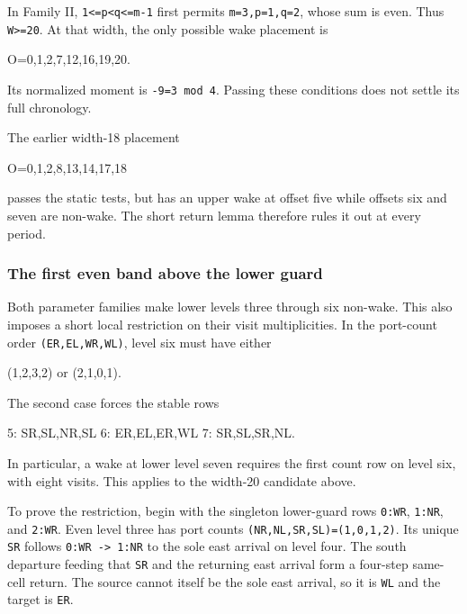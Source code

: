 \documentclass[11pt,letterpaper]{article}
\theoremstyle{plain}
\theoremstyle{definition}
\begin{document}
\begin{NoHyper}
In Family II, \texttt{1\textless{}=p\textless{}q\textless{}=m-1} first permits \texttt{m=3,p=1,q=2}, whose sum is even. Thus \texttt{W\textgreater{}=20}. At that width, the only possible wake placement is

\begin{codeblock}
O={0,1,2,7,12,16,19,20}.
\end{codeblock}

Its normalized moment is \texttt{-9=3\ mod\ 4}. Passing these conditions does not settle its full chronology.

The earlier width-18 placement

\begin{codeblock}
O={0,1,2,8,13,14,17,18}
\end{codeblock}

passes the static tests, but has an upper wake at offset five while offsets six and seven are non-wake. The short return lemma therefore rules it out at every period.

\subsubsection{The first even band above the lower guard}

Both parameter families make lower levels three through six non-wake. This also imposes a short local restriction on their visit multiplicities. In the port-count order \texttt{(ER,EL,WR,WL)}, level six must have either

\begin{codeblock}
(1,2,3,2) or (2,1,0,1).
\end{codeblock}

The second case forces the stable rows

\begin{codeblock}
5: SR,SL,NR,SL
6: ER,EL,ER,WL
7: SR,SL,SR,NL.
\end{codeblock}

In particular, a wake at lower level seven requires the first count row on level six, with eight visits. This applies to the width-20 candidate above.

To prove the restriction, begin with the singleton lower-guard rows \texttt{0:WR}, \texttt{1:NR}, and \texttt{2:WR}. Even level three has port counts \texttt{(NR,NL,SR,SL)=(1,0,1,2)}. Its unique \texttt{SR} follows \texttt{0:WR\ -\textgreater{}\ 1:NR} to the sole east arrival on level four. The south departure feeding that \texttt{SR} and the returning east arrival form a four-step same-cell return. The source cannot itself be the sole east arrival, so it is \texttt{WL} and the target is \texttt{ER}.


\end{NoHyper}
\end{document}
